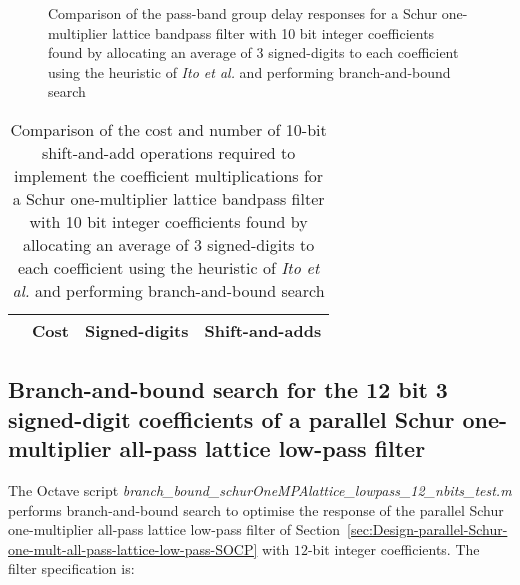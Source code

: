 \documentclass[a4paper,twoside,10pt,english]{report}
\begin{document}
\begin{figure}[!htbp]
\begin{center}
\scalebox{0.7}{}
\caption{Comparison of the pass-band group delay responses for a Schur
  one-multiplier lattice bandpass filter with 10 bit integer coefficients found
  by allocating an average of 3 signed-digits to each coefficient using the
  heuristic of \emph{Ito et al.} and performing branch-and-bound search}
\label{fig:branch-bound-schurOneMlattice-bandpass-10-nbits-delay-response}
\end{center}
\end{figure}

\begin{table}[htb]
\centering
\begin{threeparttable}
\begin{tabular}{lccc}  \\ \toprule
& Cost&Signed-digits&Shift-and-adds\\ \midrule

\bottomrule
\end{tabular}
\end{threeparttable}
\caption[Summary of cost results for the Schur one-multiplier lattice 
bandpass filter branch-and-bound algorithm example with 10 bit coefficients]
{Comparison of the cost and number of 10-bit shift-and-add operations required 
  to implement the coefficient multiplications for a Schur one-multiplier 
  lattice bandpass filter with 10 bit integer coefficients found by allocating 
  an average of 3 signed-digits to each coefficient using the heuristic of 
  \emph{Ito et al.} and performing branch-and-bound search}
\label{tab:branch-bound-schurOneMlattice-bandpass-10-nbits-cost-summary}
\end{table}
\clearpage
\subsection{\label{sec:Branch-and-bound-search-signed-digit-coefficients-parallel-allpass-lowpass}Branch-and-bound
  search for the 12 bit 3 signed-digit coefficients of a parallel Schur one-multiplier all-pass lattice low-pass filter}
The Octave script 
\emph{branch\_bound\_schurOneMPAlattice\_lowpass\_12\_nbits\_test.m} performs
branch-and-bound search to optimise the response of the parallel
Schur one-multiplier all-pass lattice low-pass filter of
Section~\ref{sec:Design-parallel-Schur-one-mult-all-pass-lattice-low-pass-SOCP}
with $12$-bit integer coefficients. The filter specification is:
\begin{small}

\end{small} 
\end{document}
